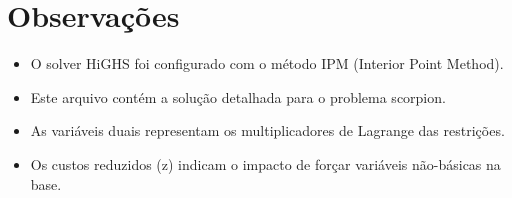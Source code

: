 \documentclass[12pt]{article}
\begin{document}
\section{Observações}

\begin{itemize}
\item O solver HiGHS foi configurado com o método IPM (Interior Point Method).
\item Este arquivo contém a solução detalhada para o problema scorpion.
\item As variáveis duais representam os multiplicadores de Lagrange das restrições.
\item Os custos reduzidos (z) indicam o impacto de forçar variáveis não-básicas na base.
\end{itemize}
\end{document}
